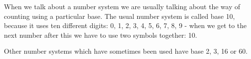 When we talk about a number system we are usually talking 
about the way of counting using a particular base. The usual
number system is called base 10, because it uses ten 
different digits: 0, 1, 2, 3, 4, 5, 6, 7, 8, 9 - when
we get to the next number after this we have to use two 
symbols together: 10.
\par
Other number systems which have sometimes been used
have base 2, 3, 16 or 60.